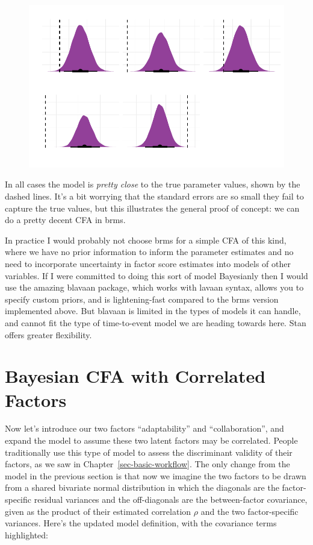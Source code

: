 \documentclass[
  letterpaper,
  DIV=11,
  numbers=noendperiod]{scrreprt}
\begin{document}
\begin{figure}[H]

{\centering \includegraphics{./bayesian-cfa_files/figure-pdf/viz-draws-basic-1.pdf}

}

\end{figure}

In all cases the model is \emph{pretty close} to the true parameter
values, shown by the dashed lines. It's a bit worrying that the standard
errors are so small they fail to capture the true values, but this
illustrates the general proof of concept: we can do a pretty decent CFA
in brms.

In practice I would probably not choose brms for a simple CFA of this
kind, where we have no prior information to inform the parameter
estimates and no need to incorporate uncertainty in factor score
estimates into models of other variables. If I were committed to doing
this sort of model Bayesianly then I would use the amazing blavaan
package, which works with lavaan syntax, allows you to specify custom
priors, and is lightening-fast compared to the brms version implemented
above. But blavaan is limited in the types of models it can handle, and
cannot fit the type of time-to-event model we are heading towards here.
Stan offers greater flexibility.

\hypertarget{bayesian-cfa-with-correlated-factors}{%
\section{Bayesian CFA with Correlated
Factors}\label{bayesian-cfa-with-correlated-factors}}

Now let's introduce our two factors ``adaptability'' and
``collaboration'', and expand the model to assume these two latent
factors may be correlated. People traditionally use this type of model
to assess the discriminant validity of their factors, as we saw in
Chapter~\ref{sec-basic-workflow}. The only change from the model in the
previous section is that now we imagine the two factors to be drawn from
a shared bivariate normal distribution in which the diagonals are the
factor-specific residual variances and the off-diagonals are the
between-factor covariance, given as the product of their estimated
correlation \(\rho\) and the two factor-specific variances. Here's the
updated model definition, with the covariance terms highlighted:
\end{document}
